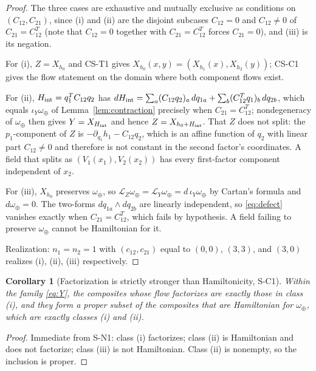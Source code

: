 \documentclass[11pt]{article}
\theoremstyle{plain}
\newtheorem{corollary}[definition]{Corollary}
\newcommand{\Lie}{\mathcal{L}}
\begin{document}
\begin{proof}
The three cases are exhaustive and mutually exclusive as conditions on
$(C_{12},C_{21})$, since (i) and (ii) are the disjoint subcases $C_{12}=0$ and
$C_{12}\neq0$ of $C_{21}=C_{12}^{T}$ (note that $C_{12}=0$ together with
$C_{21}=C_{12}^{T}$ forces $C_{21}=0$), and (iii) is its negation.

For (i), $Z=X_{h_0}$ and CS-T1 gives $X_{h_0}(x,y)=(X_{h_1}(x),X_{h_2}(y))$;
CS-C1 gives the flow statement on the domain where both component flows exist.

For (ii), $H_{\rm int}=q_1^{T}C_{12}q_2$ has
$dH_{\rm int}=\sum_a(C_{12}q_2)_a\,dq_{1a}+\sum_b(C_{12}^{T}q_1)_b\,dq_{2b}$,
which equals $\iota_Y\omega_\oplus$ of Lemma~\ref{lem:contraction} precisely
when $C_{21}=C_{12}^{T}$; nondegeneracy of $\omega_\oplus$ then gives
$Y=X_{H_{\rm int}}$ and hence $Z=X_{h_0+H_{\rm int}}$. That $Z$ does not split:
the $p_1$-component of $Z$ is $-\partial_{q_1}h_1-C_{12}q_2$, which is an affine
function of $q_2$ with linear part $C_{12}\neq0$ and therefore is not constant
in the second factor's coordinates. A field that splits as $(V_1(x_1),V_2(x_2))$
has every first-factor component independent of $x_2$.

For (iii), $X_{h_0}$ preserves $\omega_\oplus$, so
$\Lie_Z\omega_\oplus=\Lie_Y\omega_\oplus=d\,\iota_Y\omega_\oplus$ by Cartan's
formula and $d\omega_\oplus=0$. The two-forms $dq_{1a}\wedge dq_{2b}$ are
linearly independent, so \eqref{eq:defect} vanishes exactly when
$C_{21}=C_{12}^{T}$, which fails by hypothesis. A field failing to preserve
$\omega_\oplus$ cannot be Hamiltonian for it.

Realization: $n_1=n_2=1$ with $(c_{12},c_{21})$ equal to $(0,0)$, $(3,3)$, and
$(3,0)$ realizes (i), (ii), (iii) respectively.
\end{proof}

\begin{corollary}[Factorization is strictly stronger than Hamiltonicity, S-C1]
\label{cor:strict}
Within the family \eqref{eq:Y}, the composites whose flow factorizes are exactly
those in class (i), and they form a proper subset of the composites that are
Hamiltonian for $\omega_\oplus$, which are exactly classes (i) and (ii).
\end{corollary}

\begin{proof}
Immediate from S-N1: class (i) factorizes; class (ii) is Hamiltonian and does
not factorize; class (iii) is not Hamiltonian. Class (ii) is nonempty, so the
inclusion is proper.
\end{proof}
\end{document}
